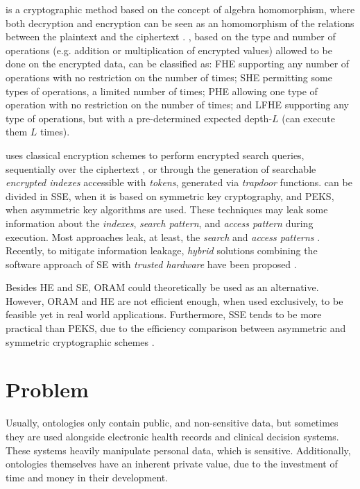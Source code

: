  is a cryptographic method based on the concept of algebra homomorphism, where both decryption and encryption can be seen as an homomorphism of the relations between the plaintext and the ciphertext \autocite{Acar2018-mp, Fontaine2007-sv}. , based on the type and number of operations (e.g. addition or multiplication of encrypted values) allowed to be done on the encrypted data, can be classified as: \gls{FHE} supporting any number of operations with no restriction on the number of times; \gls{SHE} permitting some types of operations, a limited number of times; \gls{PHE} allowing one type of operation with no restriction on the number of times; and \gls{LFHE} \autocite{Brakerski2014-nm} supporting any type of operations, but with a pre-determined expected depth-$L$ (can execute them $L$ times).

 uses classical encryption schemes to perform encrypted search queries, sequentially over the ciphertext \autocite{Song2000-hu}, or through the generation of searchable \emph{encrypted indexes} accessible with \emph{tokens}, generated via \emph{trapdoor} functions.  can be divided in \gls{SSE}, when it is based on symmetric key cryptography, and \gls{PEKS}, when asymmetric key algorithms are used. These techniques may leak some information about the \emph{indexes}, \emph{search pattern}, and \emph{access pattern} during execution. Most approaches leak, at least, the \emph{search} and \emph{access patterns} \autocite{Bosch2014-eb}. Recently, to mitigate information leakage, \emph{hybrid} solutions combining the software approach of \gls{SE} with \emph{trusted hardware} have been proposed \autocite{Ferreira2020-ze}.

Besides \gls{HE} and \gls{SE}, \gls{ORAM} \autocite{Goldreich1996-yb} could theoretically be used as an alternative. However, \gls{ORAM} and \gls{HE} are not efficient enough, when used exclusively, to be feasible yet \autocite{Bosch2014-eb} in real world applications. Furthermore, \gls{SSE} tends to be more practical than \gls{PEKS}, due to the efficiency comparison between asymmetric and symmetric cryptographic schemes \autocite{Pearson2017-ve}. 

\section{Problem}
\label{ch1:sec:problem}

Usually, ontologies only contain public, and non-sensitive data, but sometimes they are used alongside electronic health records and clinical decision systems. These systems heavily manipulate personal data, which is sensitive. Additionally, ontologies themselves have an inherent private value, due to the investment of time and money in their development.

